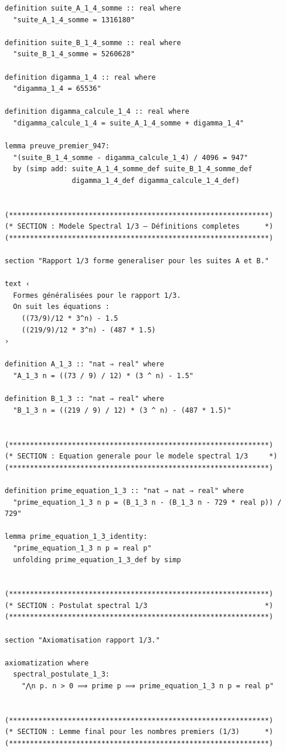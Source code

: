 \documentclass[a4paper,11pt]{article}
\begin{document}
\begin{holcode}[title={\textcolor{white}{File: methode\_spectral.thy -- Part 1/4}}]
\begin{lstlisting}
definition suite_A_1_4_somme :: real where
  "suite_A_1_4_somme = 1316180"

definition suite_B_1_4_somme :: real where
  "suite_B_1_4_somme = 5260628"

definition digamma_1_4 :: real where
  "digamma_1_4 = 65536"

definition digamma_calcule_1_4 :: real where
  "digamma_calcule_1_4 = suite_A_1_4_somme + digamma_1_4"

lemma preuve_premier_947:
  "(suite_B_1_4_somme - digamma_calcule_1_4) / 4096 = 947"
  by (simp add: suite_A_1_4_somme_def suite_B_1_4_somme_def
                digamma_1_4_def digamma_calcule_1_4_def)


(**************************************************************)
(* SECTION : Modele Spectral 1/3 – Définitions completes      *)
(**************************************************************)

section "Rapport 1/3 forme generaliser pour les suites A et B."

text ‹
  Formes généralisées pour le rapport 1/3.
  On suit les équations :
    ((73/9)/12 * 3^n) - 1.5
    ((219/9)/12 * 3^n) - (487 * 1.5)
›

definition A_1_3 :: "nat ⇒ real" where
  "A_1_3 n = ((73 / 9) / 12) * (3 ^ n) - 1.5"

definition B_1_3 :: "nat ⇒ real" where
  "B_1_3 n = ((219 / 9) / 12) * (3 ^ n) - (487 * 1.5)"


(**************************************************************)
(* SECTION : Equation generale pour le modele spectral 1/3     *)
(**************************************************************)

definition prime_equation_1_3 :: "nat ⇒ nat ⇒ real" where
  "prime_equation_1_3 n p = (B_1_3 n - (B_1_3 n - 729 * real p)) / 729"

lemma prime_equation_1_3_identity:
  "prime_equation_1_3 n p = real p"
  unfolding prime_equation_1_3_def by simp


(**************************************************************)
(* SECTION : Postulat spectral 1/3                            *)
(**************************************************************)

section "Axiomatisation rapport 1/3."

axiomatization where
  spectral_postulate_1_3:
    "⋀n p. n > 0 ⟹ prime p ⟹ prime_equation_1_3 n p = real p"


(**************************************************************)
(* SECTION : Lemme final pour les nombres premiers (1/3)      *)
(**************************************************************)


\end{lstlisting}
\end{holcode}
\end{document}
